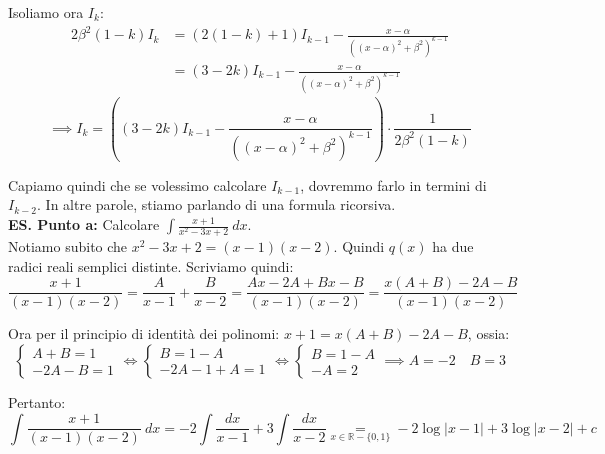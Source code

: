 \documentclass{article}
\begin{document}
\noindent Isoliamo ora $I_k$:
\begin{align*}
    2\beta^2(1 - k) I_k &= (2(1 - k) + 1)I_{k - 1} - \frac{x - \alpha}{((x - \alpha)^2 + \beta^2)^{k - 1}} \\
    &= (3 - 2k)I_{k - 1} - \frac{x - \alpha}{((x - \alpha)^2 + \beta^2)^{k - 1}}
\end{align*}
\begin{equation*}
    \implies I_k = \left((3 - 2k)I_{k - 1} - \frac{x - \alpha}{((x - \alpha)^2 + \beta^2)^{k - 1}}\right) \cdot \frac{1}{2\beta^2(1 - k)}
\end{equation*}

\noindent Capiamo quindi che se volessimo calcolare $I_{k - 1}$, dovremmo farlo in termini di $I_{k - 2}$. In altre parole, stiamo parlando di una formula ricorsiva. \\

\noindent\textbf{ES. Punto a:} Calcolare $\int \frac{x + 1}{x^2 - 3x + 2} \ dx$. \\
Notiamo subito che $x^2 - 3x + 2 = (x - 1)(x - 2)$. Quindi $q(x)$ ha due radici reali semplici distinte. Scriviamo quindi:
\begin{equation*}
    \frac{x + 1}{(x - 1)(x - 2)} = \frac{A}{x - 1} + \frac{B}{x - 2} = \frac{Ax - 2A + Bx - B}{(x - 1)(x - 2)} = \frac{x(A + B) - 2A - B}{(x - 1)(x -2)}
\end{equation*}

\noindent Ora per il principio di identità dei polinomi: $x + 1 = x(A + B) - 2A - B$, ossia:
\begin{equation*}
    \begin{cases}
        A + B = 1 \\
        -2A - B = 1
    \end{cases}
    \iff 
    \begin{cases}
        B = 1 - A \\
        -2A - 1 + A = 1
    \end{cases}
    \iff 
    \begin{cases}
        B = 1 - A \\
        -A = 2
    \end{cases}
    \implies A  =- 2 \quad B = 3
\end{equation*}

\noindent Pertanto:
\begin{equation*}
    \int \frac{x + 1}{(x - 1)(x - 2)} \ dx = -2 \int \frac{dx}{x - 1} + 3\int \frac{dx}{x - 2} \underset{x \in \mathbb{R} - \{0 , 1\}}{=} -2\log|x - 1| + 3\log|x - 2| + c
\end{equation*}
\end{document}
